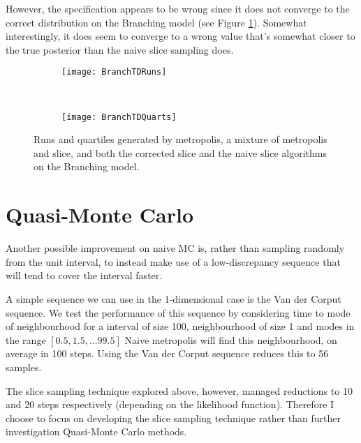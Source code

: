 However, the specification appears to be wrong since it does not converge to the correct distribution on the Branching model (see Figure \ref{fig:branchTD}). Somewhat interestingly, it does seem to converge to a wrong value that's somewhat closer to the true posterior than the naive slice sampling does.

\begin{figure}[h]
        \centering
        \begin{subfigure}[b]{0.48\textwidth}
                \centering
                \texttt{[image: BranchTDRuns]}
        \end{subfigure}
        ~ 
        \begin{subfigure}[b]{0.48\textwidth}
                \centering
                \texttt{[image: BranchTDQuarts]}
        \end{subfigure}
    \caption{Runs and quartiles generated by metropolis, a mixture of metropolis and slice, and both the corrected slice and the naive slice algorithms on the Branching model.}
    \label{fig:branchTD}
\end{figure}

\section{Quasi-Monte Carlo}
Another possible improvement on naive MC is, rather than sampling randomly from the unit interval, to instead make use of a low-discrepancy sequence that will tend to cover the interval faster.

A simple sequence we can use in the 1-dimensional case is the Van der Corput sequence.
We test the performance of this sequence by considering time to mode of neighbourhood for a interval of size 100, neighbourhood of size 1 and modes in the range $[0.5, 1.5, \ldots 99.5]$
Naive metropolis will find this neighbourhood, on average in 100 steps. Using the Van der Corput sequence reduces this to 56 samples. 

The slice sampling technique explored above, however,  managed reductions to 10 and 20 steps respectively (depending on the likelihood function). Therefore I choose to focus on developing the slice sampling technique rather than further investigation Quasi-Monte Carlo methods.


